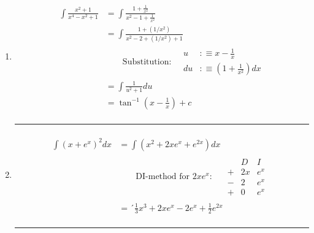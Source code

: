 \begin{enumerate}
  \item
    \begin{equation}
      \begin{aligned}
        \int\frac{x^2 + 1}{x^4-x^2+1}
        &= \int \frac{1+\frac{1}{x^2}}{x^2-1+\frac{1}{x^2}} \\
        &= \int \frac{1+(1/x^2)}{x^2-2+(1/x^2)+1} \\
        & \qquad
          \text{Substitution:}
          \quad
          \boxed{\begin{aligned}
               u &:\equiv x-\frac{1}{x} \\
              du &:\equiv \left(1+\frac{1}{x^2}\right)dx
                \end{aligned}
          } \\
        &= \int \frac{1}{u^2+1} du \\
        &=\tan^{-1} \left(x-\frac{1}{x}\right)+c
      \end{aligned}
    \end{equation}
    \paragraph{}
    \hrule
    \paragraph{}

  \item
    \begin{equation}
      \begin{aligned}
        \int (x+e^x)^2 dx
        & = \int (x^2 + 2xe^x+e^{2x}) dx \\
        & \qquad
          \text{DI-method for $2xe^x$:}
          \quad
          \boxed{
            \begin{aligned}
              \begin{array}{ccc}
                & D & I \\
               +& 2x & e^x \\
               -& 2 & e^x \\
               +& 0 & e^x
              \end{array}
            \end{aligned}
          } \\
        & =´\frac{1}{3}x^3 + 2xe^x-2e^x+\frac{1}{2}e^{2x}
      \end{aligned}
    \end{equation}
    \paragraph{}
    \hrule

\end{enumerate}
